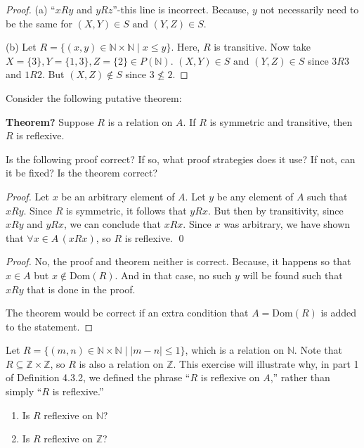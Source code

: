\documentclass[12pt]{article}
\newenvironment{exercise}[2][Exercise]{\begin{trivlist}
\item[\hskip \labelsep {\bfseries #1}\hskip \labelsep {\bfseries #2.}]}{\end{trivlist}}
\newcommand{\nd}{\text{ and }}
\begin{document}
\begin{proof}
	(a) ``\( x R y \) and \( y R z \)''-this line is incorrect. Because, $y$ not necessarily need to be the same for $(X,Y)\in S \nd (Y,Z)\in S$.

	(b) Let $R=\{(x,y)\in \mathbb{N}\times \mathbb{N}\mid x\leq y\}$. Here, $R$ is transitive. Now take $X=\{3\}, Y=\{1,3\}, Z=\{2\}\in P(\mathbb{N})$. $(X,Y)\in S \nd (Y,Z)\in S$ since $3R3$ and $1R2$. But $(X,Z)\notin S$ since $3\not\leq 2$.  
\end{proof}

\begin{exercise}
	{22}
	Consider the following putative theorem:

	\textbf{Theorem?} Suppose \( R \) is a relation on \( A \). If \( R \) is symmetric and transitive, then \( R \) is reflexive.

	Is the following proof correct? If so, what proof strategies does it use? If not, can it be fixed? Is the theorem correct?

	\textit{Proof.} Let \( x \) be an arbitrary element of \( A \). Let \( y \) be any element of \( A \) such that \( x R y \). Since \( R \) is symmetric, it follows that \( y R x \). But then by transitivity, since \( x R y \) and \( y R x \), we can conclude that \( x R x \). Since \( x \) was arbitrary, we have shown that \( \forall x \in A \, (x R x) \), so \( R \) is reflexive. \qed
\end{exercise}

\begin{proof}
	No, the proof and theorem neither is correct. Because, it happens so that $x\in A$ but $x\notin \text{Dom}(R)$. And in that case, no such $y$ will be found such that $xRy$ that is done in the proof.
	
	The theorem would be correct if an extra condition that $A=\text{Dom}(R)$ is added to the statement. 
\end{proof}

\begin{exercise}
	{24}
	Let \( R = \{(m, n) \in \mathbb{N} \times \mathbb{N} \mid |m - n| \leq 1 \} \), which is a relation on \( \mathbb{N} \). Note that \( R \subseteq \mathbb{Z} \times \mathbb{Z} \), so \( R \) is also a relation on \( \mathbb{Z} \). This exercise will illustrate why, in part 1 of Definition 4.3.2, we defined the phrase “\( R \) is reflexive on \( A \),” rather than simply “\( R \) is reflexive.”
	\begin{enumerate}
		\item[(a)] Is \( R \) reflexive on \( \mathbb{N} \)?
		\item[(b)] Is \( R \) reflexive on \( \mathbb{Z} \)?
	\end{enumerate}
\end{exercise}
\end{document}
